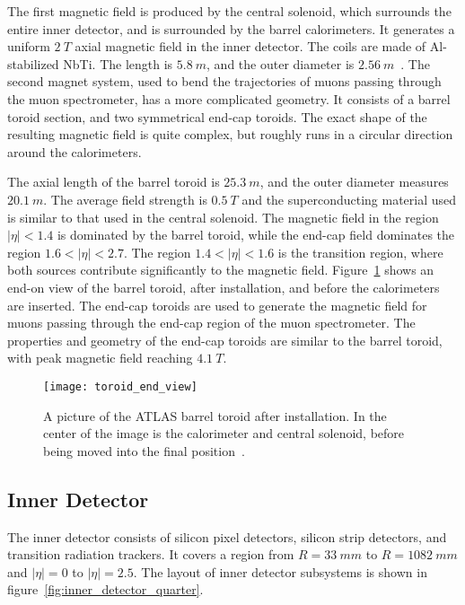 The first magnetic field is produced by the central solenoid, which surrounds the entire inner detector, and is surrounded by the barrel calorimeters.
It generates a uniform $2~T$ axial magnetic field in the inner detector.
The coils are made of Al-stabilized NbTi. The length is $5.8~m$, and the outer diameter is $2.56~m$~\cite{atlas-detector-2008}.
The second magnet system, used to bend the trajectories of muons passing through the muon spectrometer, has a more complicated geometry.
It consists of a barrel toroid section, and two symmetrical end-cap toroids.
The exact shape of the resulting magnetic field is quite complex, but roughly runs in a circular direction around the calorimeters.

The axial length of the barrel toroid is $25.3~m$, and the outer diameter measures $20.1~m$.
The average field strength is $0.5~T$ and the superconducting material used is similar to that used in the central solenoid\cite{atlas-detector-2008}.
The magnetic field in the region $|\eta|<1.4$ is dominated by the barrel toroid, while the end-cap field dominates the region $1.6 < |\eta| < 2.7$.
The region $1.4 < |\eta| < 1.6$ is the transition region, where both sources contribute significantly to the magnetic field.
Figure~\ref{fig:toroid_end_view} shows an end-on view of the barrel toroid, after installation, and before the calorimeters are inserted.
The end-cap toroids are used to generate the magnetic field for muons passing through the end-cap region of the muon spectrometer.
The properties and geometry of the end-cap toroids are similar to the barrel toroid,
with peak magnetic field reaching $4.1~T$\cite{atlas-detector-2008}.

\begin{figure}[!ht]\centering
\texttt{[image: toroid\_end\_view]}
\caption{A picture of the ATLAS barrel toroid after installation.
In the center of the image is the calorimeter and central solenoid, before being moved into the final position~\cite{atlas-detector-2008}.}
\label{fig:toroid_end_view}
\end{figure}

\subsection{Inner Detector}\label{subsec:inner_detector}
The inner detector consists of silicon pixel detectors, silicon strip detectors, and transition radiation trackers.
It covers a region from $R = 33~mm$ to $R = 1082~mm$ and $|\eta| = 0$ to $|\eta| = 2.5$.
The layout of inner detector subsystems is shown in figure~\ref{fig:inner_detector_quarter}.

